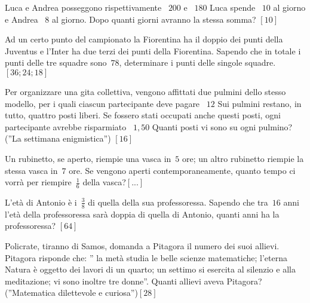 \begin{multicols}{2}
\begin{esercizio}[\Ast]
\label{ese:14.39}
Luca e Andrea posseggono rispettivamente \officialeuro~$200$ e 
\officialeuro~$180$ Luca spende \officialeuro~$10$ al giorno e Andrea 
\officialeuro~$8$ al giorno. Dopo quanti giorni avranno la stessa somma? 
\hfill $\left[10\right]$
\end{esercizio}

\begin{esercizio}[\Ast]
\label{ese:14.40}
Ad un certo punto del campionato la Fiorentina ha il doppio dei punti della 
Juventus e l'Inter ha due terzi dei punti della Fiorentina. Sapendo che in 
totale i punti delle tre squadre sono~$78$, determinare i punti delle singole 
squadre. \hfill $\left[36; 24; 18\right]$
\end{esercizio}

\begin{esercizio}[\Ast]
\label{ese:14.41}
Per organizzare una gita collettiva, vengono affittati due pulmini dello stesso 
modello, per i quali ciascun partecipante deve pagare \officialeuro~$12$ Sui 
pulmini restano, in tutto, quattro posti liberi. Se fossero stati occupati anche 
questi posti, ogni partecipante avrebbe risparmiato \officialeuro~$1,50$ Quanti 
posti vi sono su ogni pulmino? (''La settimana enigmistica'') 
\hfill $\left[16\right]$
\end{esercizio}

\begin{esercizio}
\label{ese:14.42}
Un rubinetto, se aperto, riempie una vasca in~$5$ ore; un altro rubinetto 
riempie la stessa vasca in~$7$ ore. Se vengono aperti contemporaneamente, quanto 
tempo ci vorrà per riempire~$\frac{1}{6}$ della vasca?\hfill $\left[...\right]$
\end{esercizio}

\begin{esercizio}[\Ast]
\label{ese:14.43}
L'età di Antonio è i~$\frac{3}{8}$ di quella della sua professoressa. Sapendo 
che tra~$16$ anni l'età della professoressa sarà doppia di quella di Antonio, 
quanti anni ha la professoressa? \hfill $\left[64\right]$
\end{esercizio}

\begin{esercizio}[\Ast]
\label{ese:14.44}
Policrate, tiranno di Samos, domanda a Pitagora il numero dei suoi allievi. 
Pitagora risponde che: '' la metà studia le belle scienze matematiche; l'eterna 
Natura è oggetto dei lavori di un quarto; un settimo si esercita al silenzio e 
alla meditazione; vi sono inoltre tre donne''. Quanti allievi aveva Pitagora? 
(''Matematica dilettevole e curiosa'')\hfill $\left[28\right]$
\end{esercizio}


\end{multicols}
